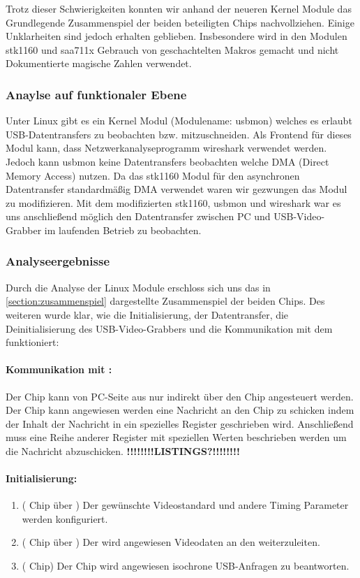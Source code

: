 Trotz dieser Schwierigkeiten konnten wir anhand der neueren Kernel Module das Grundlegende Zusammenspiel der beiden beteiligten Chips nachvollziehen. Einige Unklarheiten sind jedoch erhalten geblieben. Insbesondere wird in den Modulen stk1160 und saa711x Gebrauch von geschachtelten Makros gemacht und nicht Dokumentierte magische Zahlen verwendet. 

\subsubsection{Anaylse auf funktionaler Ebene}
Unter Linux gibt es ein Kernel Modul (Modulename: usbmon) welches es erlaubt USB-Datentransfers zu beobachten bzw. 
mitzuschneiden. Als Frontend für dieses Modul kann, dass Netzwerkanalyseprogramm wireshark verwendet werden. 
Jedoch kann usbmon keine Datentransfers beobachten welche DMA (Direct Memory Access) nutzen. Da das stk1160 Modul für den 
asynchronen Datentransfer standardmäßig DMA verwendet waren wir gezwungen das Modul zu modifizieren.
Mit dem modifizierten stk1160, usbmon und wireshark war es uns anschließend möglich den Datentransfer zwischen PC
und USB-Video-Grabber im laufenden Betrieb zu beobachten.

\subsubsection{Analyseergebnisse}
Durch die Analyse der Linux Module erschloss sich uns das in \autoref{section:zusammenspiel} dargestellte Zusammenspiel der
beiden Chips. Des weiteren wurde klar, wie die Initialisierung, der Datentransfer, die Deinitialisierung des
USB-Video-Grabbers und die Kommunikation mit dem \saa{} funktioniert:

\paragraph{Kommunikation mit \saa{}:} Der \saa{} Chip kann von PC-Seite aus nur indirekt über den \stk{} Chip angesteuert werden.
Der \stk{} Chip kann angewiesen werden eine \iic{} Nachricht an den \saa{} Chip zu schicken indem der Inhalt der Nachricht in ein
spezielles Register geschrieben wird. Anschließend muss eine Reihe anderer Register mit speziellen Werten beschrieben werden um
die Nachricht abzuschicken. \textbf{!!!!!!!!LISTINGS?!!!!!!!!}

\paragraph{Initialisierung:}
\begin{enumerate}
 \item (\saa{} Chip über \iic{}) Der gewünschte Videostandard und andere Timing Parameter werden konfiguriert.
 \item (\saa{} Chip über \iic{}) Der \saa{} wird angewiesen Videodaten an den \stk{} weiterzuleiten.
 \item (\stk{} Chip) Der Chip wird angewiesen isochrone USB-Anfragen zu beantworten.
\end{enumerate}


